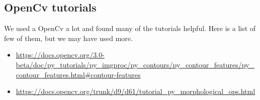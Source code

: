 \documentclass[Report.tex]{subfiles}
\begin{document}
\subsection{OpenCv tutorials}
We used a OpenCv a lot and found many of the tutorials helpful. Here is a list of few of them, but we may have used more.  
\begin{itemize}
    \item \url{https://docs.opencv.org/3.0-beta/doc/py_tutorials/py_imgproc/py_contours/py_contour_features/py_contour_features.html#contour-features}
    
    \item \url{https://docs.opencv.org/trunk/d9/d61/tutorial_py_morphological_ops.html}
\end{itemize}
\end{document}
